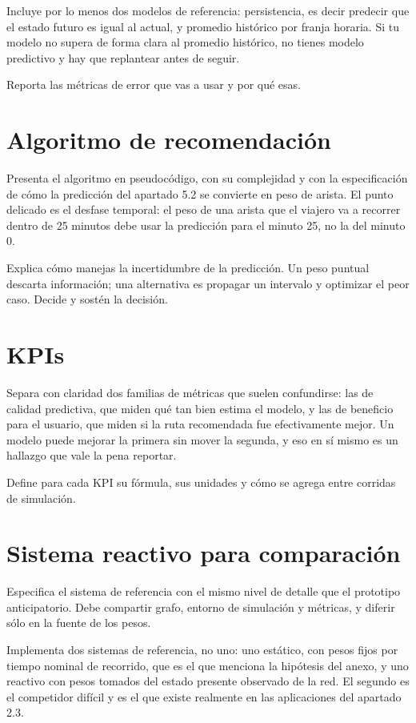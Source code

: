 \documentclass[letterpaper,12pt,oneside]{book}
\theoremstyle{definition}
\theoremstyle{plain}
\theoremstyle{remark}
\begin{document}
Incluye por lo menos dos modelos de referencia: persistencia, es decir predecir que el estado futuro es igual al actual, y promedio histórico por franja horaria. Si tu modelo no supera de forma clara al promedio histórico, no tienes modelo predictivo y hay que replantear antes de seguir.

Reporta las métricas de error que vas a usar y por qué esas.

\section{Algoritmo de recomendación}
Presenta el algoritmo en pseudocódigo, con su complejidad y con la especificación de cómo la predicción del apartado 5.2 se convierte en peso de arista. El punto delicado es el desfase temporal: el peso de una arista que el viajero va a recorrer dentro de 25 minutos debe usar la predicción para el minuto 25, no la del minuto 0.

Explica cómo manejas la incertidumbre de la predicción. Un peso puntual descarta información; una alternativa es propagar un intervalo y optimizar el peor caso. Decide y sostén la decisión.

\section{KPIs}
Separa con claridad dos familias de métricas que suelen confundirse: las de calidad predictiva, que miden qué tan bien estima el modelo, y las de beneficio para el usuario, que miden si la ruta recomendada fue efectivamente mejor. Un modelo puede mejorar la primera sin mover la segunda, y eso en sí mismo es un hallazgo que vale la pena reportar.

Define para cada KPI su fórmula, sus unidades y cómo se agrega entre corridas de simulación.

\section{Sistema reactivo para comparación}
Especifica el sistema de referencia con el mismo nivel de detalle que el prototipo anticipatorio. Debe compartir grafo, entorno de simulación y métricas, y diferir sólo en la fuente de los pesos.

Implementa dos sistemas de referencia, no uno: uno estático, con pesos fijos por tiempo nominal de recorrido, que es el que menciona la hipótesis del anexo, y uno reactivo con pesos tomados del estado presente observado de la red. El segundo es el competidor difícil y es el que existe realmente en las aplicaciones del apartado 2.3.
\end{document}
